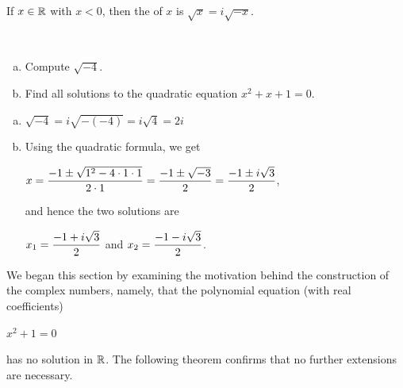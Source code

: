 \documentclass[11pt,fleqn,dvipsnames,usenames]{article}
\newcommand{\p}{\noindent}
\begin{document}
\begin{definition}
If $x\in\mathbb{R}$ with $x < 0$, then the  of $x$ is $\sqrt{x} = i\sqrt{-x}$.
\end{definition}
%
\begin{examples}~
\begin{enumerate}[(a)]
\item Compute $\sqrt{-4}$.
\item Find all solutions to the quadratic equation $x^2 + x + 1 = 0$.
\end{enumerate}
\end{examples}
%
\begin{solution}
\begin{enumerate}[(a)]
\item $\sqrt{-4} = i\sqrt{-(-4)} = i\sqrt{4} = 2i$
\item Using the quadratic formula, we get
\begin{center}
$\displaystyle{x = \frac{-1 \pm \sqrt{1^2 - 4\cdot 1\cdot 1}}{2\cdot 1} = \frac{-1 \pm \sqrt{-3}}{2} = \frac{-1 \pm i\sqrt{3}}{2}}$,
\end{center}
and hence the two solutions are
\begin{center}
$\displaystyle{x_{1} = \frac{-1 +i\sqrt{3}}{2}}$ and $\displaystyle{x_{2} = \frac{-1 -i\sqrt{3}}{2}}$.
\end{center}
\end{enumerate}
\end{solution}
%
\p We began this section by examining the motivation behind the construction of the complex numbers, namely, that the polynomial equation (with real coefficients)
\begin{center}
$x^2 + 1 = 0$
\end{center}
\p has no solution in $\mathbb{R}$.  The following theorem confirms that no further extensions are necessary.
\end{document}
